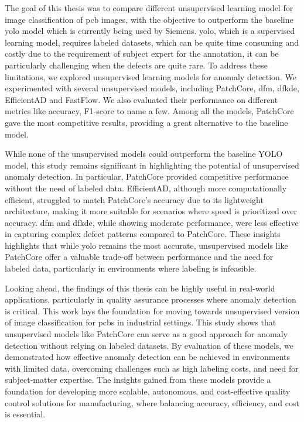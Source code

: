 The goal of this thesis was to compare different unsupervised learning model for image classification of \gls{pcb} images, with the objective to outperform the baseline \gls{yolo} model which is currently being used by Siemens. \gls{yolo}, which is a supervised learning model, requires labeled datasets, which can be quite time consuming and costly due to the requirement of subject expert for the annotation, it can be particularly challenging when the defects are quite rare. To address these limitations, we explored unsupervised learning models for anomaly detection. We experimented with several unsupervised models, including PatchCore, \gls{dfm}, \gls{dfkde}, EfficientAD and FastFlow. We also evaluated their performance on different metrics like accuracy, F1-score to name a few. Among all the models, PatchCore gave the most competitive results, providing a great alternative to the baseline model.

While none of the unsupervised models could outperform the baseline YOLO model, this study remains significant in highlighting the potential of unsupervised anomaly detection. In particular, PatchCore provided competitive performance without the need of labeled data. EfficientAD, although more computationally efficient, struggled to match PatchCore's accuracy due to its lightweight architecture, making it more suitable for scenarios where speed is prioritized over accuracy. \gls{dfm} and \gls{dfkde}, while showing moderate performance, were less effective in capturing complex defect patterns compared to PatchCore. These insights highlights that while \gls{yolo} remains the most accurate, unsupervised models like PatchCore offer a valuable trade-off between performance and the need for labeled data, particularly in environments where labeling is infeasible.

Looking ahead, the findings of this thesis can be highly useful in real-world applications, particularly in quality assurance processes where anomaly detection is critical.  This work lays the foundation for moving towards unsupervised version of image classification for \glspl{pcb} in industrial settings. This study shows that unsupervised models like PatchCore can serve as a good approach for anomaly detection without relying on labeled datasets. By evaluation of these models, we demonstrated how effective anomaly detection can be achieved in environments with limited data, overcoming challenges such as high labeling costs, and need for subject-matter expertise. The insights gained from these models provide a foundation for developing more scalable, autonomous, and cost-effective quality control solutions for manufacturing, where balancing accuracy, efficiency, and cost is essential.